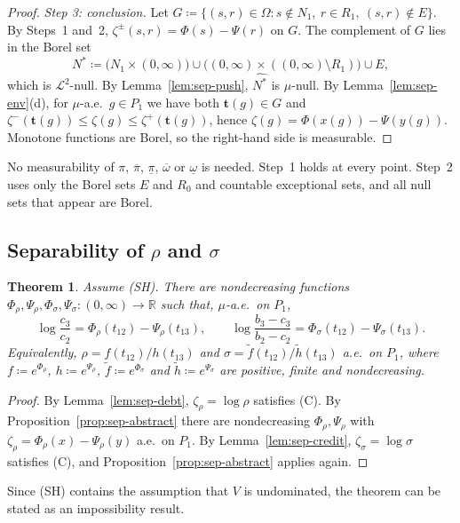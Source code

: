 \documentclass[11pt]{article}
\newtheorem{theorem}{Theorem}
\theoremstyle{definition}\newtheorem{definition}[theorem]{Definition}
\theoremstyle{remark}\newtheorem{remark}[theorem]{Remark}
\begin{document}
\begin{proof}
\emph{Step 3: conclusion.} Let
$G\coloneqq\{(s,r)\in\Omega:s\notin N_1,\ r\in R_1,\ (s,r)\notin E\}$. By
Steps~1 and~2, $\zeta^\pm(s,r)=\Phi(s)-\Psi(r)$ on $G$. The complement of
$G$ lies in the Borel set
\[
 N^*\coloneqq\bigl(N_1\times(0,\infty)\bigr)\cup
 \bigl((0,\infty)\times((0,\infty)\setminus R_1)\bigr)\cup E,
\]
which is $\mathcal L^2$-null. By Lemma~\ref{lem:sep-push}, $\widehat{N^*}$ is
$\mu$-null. By Lemma~\ref{lem:sep-env}(d), for $\mu$-a.e.\ $g\in P_1$ we have
both $\mathbf t(g)\in G$ and
$\zeta^-(\mathbf t(g))\le\zeta(g)\le\zeta^+(\mathbf t(g))$, hence
$\zeta(g)=\Phi(x(g))-\Psi(y(g))$. Monotone functions are Borel, so the
right-hand side is measurable.
\end{proof}

No measurability of $\pi$, $\overline\pi$, $\underline\pi$, $\overline\omega$
or $\underline\omega$ is needed. Step~1 holds at every point. Step~2 uses
only the Borel sets $E$ and $R_0$ and countable exceptional sets, and all
null sets that appear are Borel.

\subsection{Separability of $\rho$ and $\sigma$}

\begin{theorem}\label{thm:sep}
Assume (SH). There are nondecreasing functions
$\Phi_\rho,\Psi_\rho,\Phi_\sigma,\Psi_\sigma\colon(0,\infty)\to\mathbb R$ such
that, $\mu$-a.e.\ on $P_1$,
\[
 \log\frac{c_3}{c_2}=\Phi_\rho(t_{12})-\Psi_\rho(t_{13}),\qquad
 \log\frac{b_3-c_3}{b_2-c_2}=\Phi_\sigma(t_{12})-\Psi_\sigma(t_{13}).
\]
Equivalently, $\rho=f(t_{12})/h(t_{13})$ and
$\sigma=\tilde f(t_{12})/\tilde h(t_{13})$ a.e.\ on $P_1$, where
$f\coloneqq e^{\Phi_\rho}$, $h\coloneqq e^{\Psi_\rho}$,
$\tilde f\coloneqq e^{\Phi_\sigma}$ and $\tilde h\coloneqq e^{\Psi_\sigma}$ are
positive, finite and nondecreasing.
\end{theorem}

\begin{proof}
By Lemma~\ref{lem:sep-debt}, $\zeta_\rho=\log\rho$ satisfies (C). By
Proposition~\ref{prop:sep-abstract} there are nondecreasing
$\Phi_\rho,\Psi_\rho$ with $\zeta_\rho=\Phi_\rho(x)-\Psi_\rho(y)$ a.e.\ on
$P_1$. By Lemma~\ref{lem:sep-credit}, $\zeta_\sigma=\log\sigma$ satisfies (C),
and Proposition~\ref{prop:sep-abstract} applies again.
\end{proof}

Since (SH) contains the assumption that $V$ is undominated, the theorem can
be stated as an impossibility result.
\end{document}
